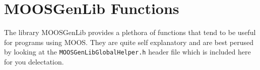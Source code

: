 \documentclass[a4paper,10pt]{article}
\newcommand{\Code}[1]{\texttt{#1} }
\newcommand{\code}[1]{\Code{#1} }
\begin{document}
\section{MOOSGenLib Functions}\label{Sec:MOOSGenLib}

The library MOOSGenLib provides a plethora of functions that tend
to be useful for programs using MOOS. They are quite self
explanatory and are best perused by looking at the
\code{MOOSGenLibGlobalHelper.h} header file which is included here
for you delectation. 
\end{document}
